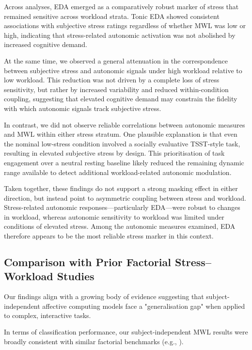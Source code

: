 \documentclass[lettersize,journal]{IEEEtran}
\begin{document}

Across analyses, EDA emerged as a comparatively robust marker of stress that remained sensitive across workload strata. Tonic EDA showed consistent associations with subjective stress ratings regardless of whether MWL was low or high, indicating that stress-related autonomic activation was not abolished by increased cognitive demand.

At the same time, we observed a general attenuation in the correspondence between subjective stress and autonomic signals under high workload relative to low workload. This reduction was not driven by a complete loss of stress sensitivity, but rather by increased variability and reduced within-condition coupling, suggesting that elevated cognitive demand may constrain the fidelity with which autonomic signals track subjective stress.

In contrast, we did not observe reliable correlations between autonomic measures and MWL within either stress stratum. One plausible explanation is that even the nominal low-stress condition involved a socially evaluative TSST-style task, resulting in elevated subjective stress by design. This prioritisation of task engagement over a neutral resting baseline likely reduced the remaining dynamic range available to detect additional workload-related autonomic modulation.

Taken together, these findings do not support a strong masking effect in either direction, but instead point to asymmetric coupling between stress and workload. Stress-related autonomic responses—particularly EDA—were robust to changes in workload, whereas autonomic sensitivity to workload was limited under conditions of elevated stress. Among the autonomic measures examined, EDA therefore appears to be the most reliable stress marker in this context.

\subsection{Comparison with Prior Factorial Stress–Workload Studies}


Our findings align with a growing body of evidence suggesting that subject-independent affective computing models face a "generalisation gap" when applied to complex, interactive tasks. 

In terms of classification performance, our subject-independent MWL results were broadly consistent with similar factorial benchmarks (e.g., \cite{bagheriSimultaneousClassificationBoth2022}).
\end{document}
